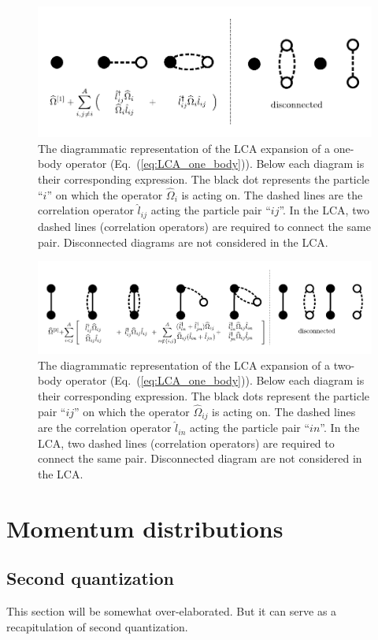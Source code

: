 \documentclass[10pt]{article}
\begin{document}
\begin{figure}
\centering
\includegraphics[scale=0.75]{figures/one_body_with_eq.pdf}
\caption{
The diagrammatic representation of the LCA expansion of a one-body operator (Eq.~(\ref{eq:LCA_one_body})).
Below each diagram is their corresponding expression.
The black dot represents the particle ``$i$'' on which the operator $\widehat{\Omega}_{i}$ is acting on.
The dashed lines are the correlation operator $\hat{l}_{ij}$ acting the particle pair ``$ij$''.
In the LCA, two dashed lines (correlation operators) are required to connect the same pair.
Disconnected diagrams are not considered in the LCA.
} 
\label{fig:LCA_one_body_diagram}
\end{figure}
%
\begin{figure}
\centering
\includegraphics[scale=0.75]{figures/two_body_with_eq.pdf}
\caption{
The diagrammatic representation of the LCA expansion of a two-body operator (Eq.~(\ref{eq:LCA_one_body})).
Below each diagram is their corresponding expression.
The black dots represent the particle pair ``$ij$'' on which the operator $\widehat{\Omega}_{ij}$ is acting on.
The dashed lines are the correlation operator $\hat{l}_{in}$ acting the particle pair ``$in$''.
In the LCA, two dashed lines (correlation operators) are required to connect the same pair.
Disconnected diagram are not considered in the LCA.
} 
\label{fig:LCA_two_body_diagram}
\end{figure}
\section{Momentum distributions}
\subsection{Second quantization}
This section will be somewhat over-elaborated. But it can serve as a recapitulation of second quantization.
\end{document}
